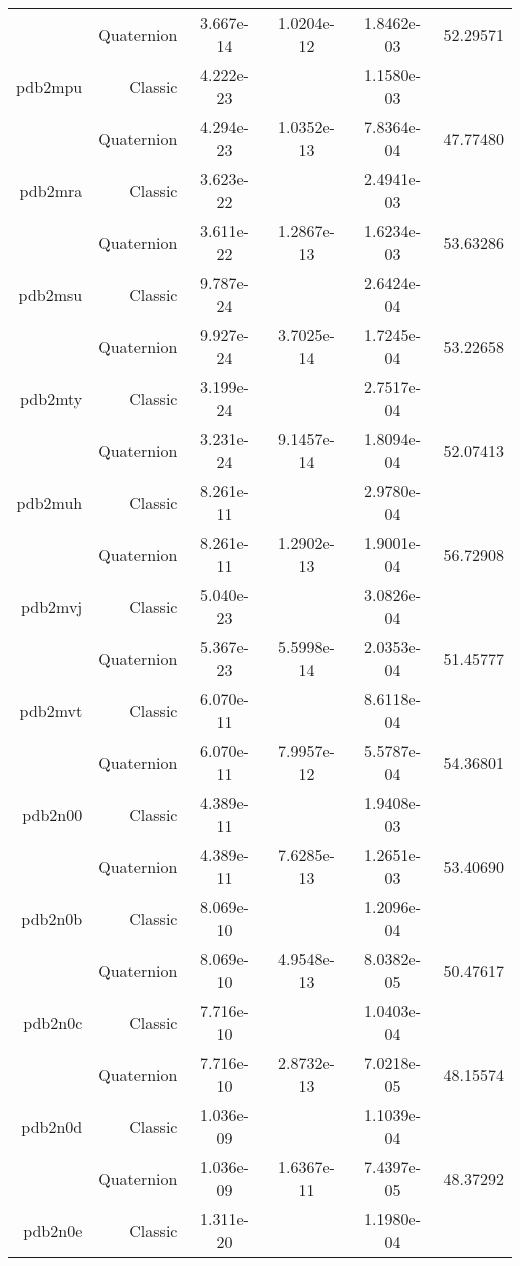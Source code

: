 \begin{xltabular}{\textwidth}{r|rS[table-format=1.3e+2]S[table-format=1.4e+2]S[table-format=1.4e+2]S[table-format=-1.5]}
& Quaternion & 3.667e-14 & 1.0204e-12 & 1.8462e-03 & 52.29571\\  \addlinespace
pdb2mpu & Classic & 4.222e-23 &  & 1.1580e-03 & \\
& Quaternion & 4.294e-23 & 1.0352e-13 & 7.8364e-04 & 47.77480\\  \addlinespace
pdb2mra & Classic & 3.623e-22 &  & 2.4941e-03 & \\
& Quaternion & 3.611e-22 & 1.2867e-13 & 1.6234e-03 & 53.63286\\  \addlinespace
pdb2msu & Classic & 9.787e-24 &  & 2.6424e-04 & \\
& Quaternion & 9.927e-24 & 3.7025e-14 & 1.7245e-04 & 53.22658\\  \addlinespace
pdb2mty & Classic & 3.199e-24 &  & 2.7517e-04 & \\
& Quaternion & 3.231e-24 & 9.1457e-14 & 1.8094e-04 & 52.07413\\  \addlinespace
pdb2muh & Classic & 8.261e-11 &  & 2.9780e-04 & \\
& Quaternion & 8.261e-11 & 1.2902e-13 & 1.9001e-04 & 56.72908\\  \addlinespace
pdb2mvj & Classic & 5.040e-23 &  & 3.0826e-04 & \\
& Quaternion & 5.367e-23 & 5.5998e-14 & 2.0353e-04 & 51.45777\\  \addlinespace
pdb2mvt & Classic & 6.070e-11 &  & 8.6118e-04 & \\
& Quaternion & 6.070e-11 & 7.9957e-12 & 5.5787e-04 & 54.36801\\  \addlinespace
pdb2n00 & Classic & 4.389e-11 &  & 1.9408e-03 & \\
& Quaternion & 4.389e-11 & 7.6285e-13 & 1.2651e-03 & 53.40690\\  \addlinespace
pdb2n0b & Classic & 8.069e-10 &  & 1.2096e-04 & \\
& Quaternion & 8.069e-10 & 4.9548e-13 & 8.0382e-05 & 50.47617\\  \addlinespace
pdb2n0c & Classic & 7.716e-10 &  & 1.0403e-04 & \\
& Quaternion & 7.716e-10 & 2.8732e-13 & 7.0218e-05 & 48.15574\\  \addlinespace
pdb2n0d & Classic & 1.036e-09 &  & 1.1039e-04 & \\
& Quaternion & 1.036e-09 & 1.6367e-11 & 7.4397e-05 & 48.37292\\  \addlinespace
pdb2n0e & Classic & 1.311e-20 &  & 1.1980e-04 & \\

\end{xltabular}
